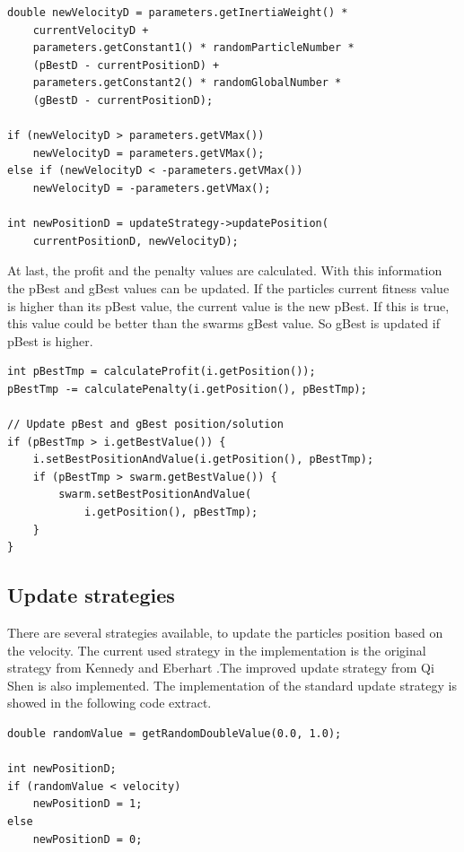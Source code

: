 \documentclass{article}
\begin{document}
\begin{lstlisting}[caption="Solver.cpp"]
double newVelocityD = parameters.getInertiaWeight() *
	currentVelocityD +
	parameters.getConstant1() * randomParticleNumber *
	(pBestD - currentPositionD) +
	parameters.getConstant2() * randomGlobalNumber *
	(gBestD - currentPositionD);

if (newVelocityD > parameters.getVMax())
    newVelocityD = parameters.getVMax();
else if (newVelocityD < -parameters.getVMax())
    newVelocityD = -parameters.getVMax();

int newPositionD = updateStrategy->updatePosition(
	currentPositionD, newVelocityD);
\end{lstlisting}

At last, the profit and the penalty values are calculated. With this information the pBest and gBest values can be updated. If the particles current fitness value is higher than its pBest value, the current value is the new pBest. If this is true, this value could be better than the swarms gBest value. So gBest is updated if pBest is higher.

\begin{lstlisting}[caption="Solver.cpp"]
int pBestTmp = calculateProfit(i.getPosition());
pBestTmp -= calculatePenalty(i.getPosition(), pBestTmp);

// Update pBest and gBest position/solution
if (pBestTmp > i.getBestValue()) {
	i.setBestPositionAndValue(i.getPosition(), pBestTmp);
	if (pBestTmp > swarm.getBestValue()) {
	    swarm.setBestPositionAndValue(
	    	i.getPosition(), pBestTmp);
	}
}
\end{lstlisting}

\subsection{Update strategies}
There are several strategies available, to update the particles position based on the velocity. The current used strategy in the implementation is the original strategy from Kennedy and Eberhart \cite{bib-discrete}.The improved update strategy from Qi Shen is also implemented. The implementation of the standard update strategy is showed in the following code extract.

\begin{lstlisting}[caption="UpdateStrategy.cpp"]
double randomValue = getRandomDoubleValue(0.0, 1.0);

int newPositionD;
if (randomValue < velocity)
    newPositionD = 1;
else
    newPositionD = 0;
\end{lstlisting}
\end{document}

